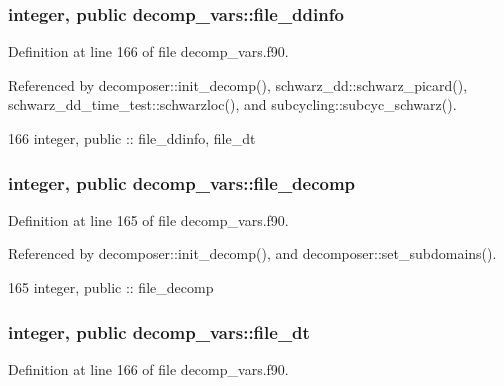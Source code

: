 \subsubsection[{file\+\_\+ddinfo}]{\setlength{\rightskip}{0pt plus 5cm}integer, public decomp\+\_\+vars\+::file\+\_\+ddinfo}\label{namespacedecomp__vars_ad752cd366331c88994f3f0c4e1eca3d1}


Definition at line 166 of file decomp\+\_\+vars.\+f90.



Referenced by decomposer\+::init\+\_\+decomp(), schwarz\+\_\+dd\+::schwarz\+\_\+picard(), schwarz\+\_\+dd\+\_\+time\+\_\+test\+::schwarzloc(), and subcycling\+::subcyc\+\_\+schwarz().


\begin{DoxyCode}
166   \textcolor{keywordtype}{integer}, \textcolor{keywordtype}{public} :: file_ddinfo, file_dt
\end{DoxyCode}
\subsubsection[{file\+\_\+decomp}]{\setlength{\rightskip}{0pt plus 5cm}integer, public decomp\+\_\+vars\+::file\+\_\+decomp}\label{namespacedecomp__vars_a3753dbd1677d3829c5a79c81b7e71478}


Definition at line 165 of file decomp\+\_\+vars.\+f90.



Referenced by decomposer\+::init\+\_\+decomp(), and decomposer\+::set\+\_\+subdomains().


\begin{DoxyCode}
165   \textcolor{keywordtype}{integer}, \textcolor{keywordtype}{public} :: file_decomp
\end{DoxyCode}
\subsubsection[{file\+\_\+dt}]{\setlength{\rightskip}{0pt plus 5cm}integer, public decomp\+\_\+vars\+::file\+\_\+dt}\label{namespacedecomp__vars_ac54947c2bf51285c6b56d7717a96aa97}


Definition at line 166 of file decomp\+\_\+vars.\+f90.



